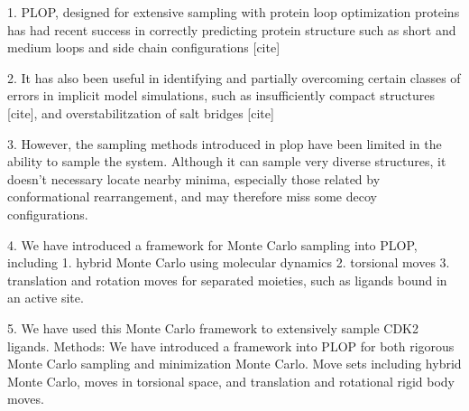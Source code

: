 1.
PLOP, designed for extensive sampling with protein loop optimization proteins has had recent success in correctly predicting protein structure such as short and medium loops and side chain configurations [cite] 

2.
It has also been useful in identifying and partially overcoming certain classes of errors in implicit model simulations, such as insufficiently compact structures [cite], and overstabilitzation of salt bridges [cite] 

3.
However, the sampling methods introduced in plop have been limited in the ability to sample the system.
Although it can sample very diverse structures, it doesn't necessary locate nearby minima, especially those related by conformational rearrangement, and may therefore miss some decoy configurations.

4.
We have introduced a framework for Monte Carlo sampling into PLOP, including 1.
hybrid Monte Carlo using molecular dynamics 2.
torsional moves 3.
translation and rotation moves for separated moieties, such as ligands bound in an active site.

5.
We have used this Monte Carlo framework to extensively sample CDK2 ligands.
Methods: We have introduced a framework into PLOP for both rigorous Monte Carlo sampling and minimization Monte Carlo.
Move sets including hybrid Monte Carlo, moves in torsional space, and translation and rotational rigid body moves.

